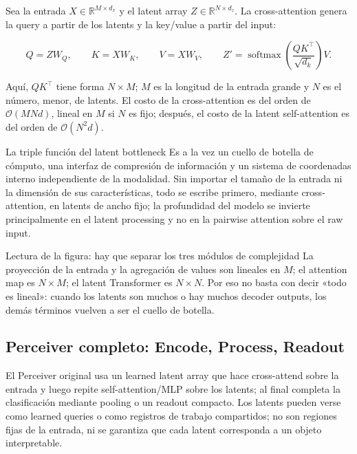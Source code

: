 Sea la entrada $X\in\mathbb{R}^{M\times d_x}$ y el latent array $Z\in\mathbb{R}^{N\times d_z}$. La cross-attention genera la query a partir de los latents y la key/value a partir del input:

\[
Q=ZW_Q,\qquad K=XW_K,\qquad V=XW_V,
\qquad
Z'=\operatorname{softmax}\!\left(\frac{QK^\top}{\sqrt{d_k}}\right)V.
\]

Aquí, $QK^\top$ tiene forma $N\times M$; $M$ es la longitud de la entrada grande y $N$ es el número, menor, de latents. El costo de la cross-attention es del orden de $\mathcal{O}(MNd)$, lineal en $M$ si $N$ es fijo; después, el costo de la latent self-attention es del orden de $\mathcal{O}(N^2d)$.


\begin{importantbox}{La triple función del latent bottleneck}
Es a la vez un cuello de botella de cómputo, una interfaz de compresión de información y un sistema de coordenadas interno independiente de la modalidad. Sin importar el tamaño de la entrada ni la dimensión de sus características, todo se escribe primero, mediante cross-attention, en latents de ancho fijo; la profundidad del modelo se invierte principalmente en el latent processing y no en la pairwise attention sobre el raw input.
\end{importantbox}

\begin{knowledgebox}{Lectura de la figura: hay que separar los tres módulos de complejidad}
La proyección de la entrada y la agregación de values son lineales en $M$; el attention map es $N\times M$; el latent Transformer es $N\times N$. Por eso no basta con decir «todo es lineal»: cuando los latents son muchos o hay muchos decoder outputs, los demás términos vuelven a ser el cuello de botella.
\end{knowledgebox}

\subsection{Perceiver completo: Encode, Process, Readout}

El Perceiver original usa un learned latent array que hace cross-attend sobre la entrada y luego repite self-attention/MLP sobre los latents; al final completa la clasificación mediante pooling o un readout compacto. Los latents pueden verse como learned queries o como registros de trabajo compartidos; no son regiones fijas de la entrada, ni se garantiza que cada latent corresponda a un objeto interpretable.

